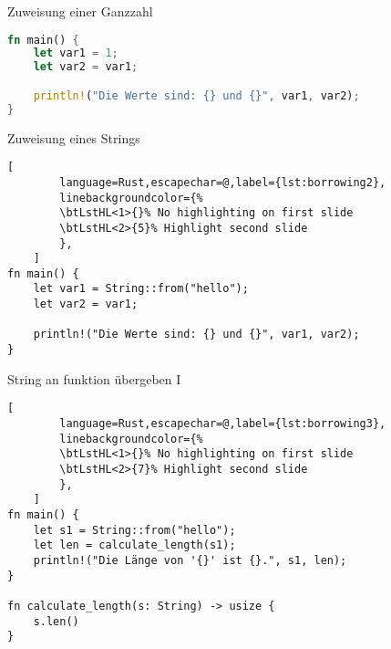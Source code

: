 
\begin{frame}[fragile,t]{Zuweisung einer Ganzzahl}
    \begin{lstlisting}[language=Rust,escapechar=@,label={lst:borrowing1}]
fn main() {
    let var1 = 1;
    let var2 = var1;

    println!("Die Werte sind: {} und {}", var1, var2);
}\end{lstlisting}
    \pause
\end{frame}

\begin{frame}[fragile,t]{Zuweisung eines Strings}
    \begin{lstlisting}[
        language=Rust,escapechar=@,label={lst:borrowing2},
        linebackgroundcolor={%
        \btLstHL<1>{}% No highlighting on first slide
        \btLstHL<2>{5}% Highlight second slide
        },
    ]
fn main() {
    let var1 = String::from("hello");
    let var2 = var1;

    println!("Die Werte sind: {} und {}", var1, var2);
}\end{lstlisting}
    \pause
\end{frame}

\begin{frame}[fragile,t]{String an funktion übergeben I}
    \begin{lstlisting}[
        language=Rust,escapechar=@,label={lst:borrowing3},
        linebackgroundcolor={%
        \btLstHL<1>{}% No highlighting on first slide
        \btLstHL<2>{7}% Highlight second slide
        },
    ]
fn main() {
    let s1 = String::from("hello");
    let len = calculate_length(s1);
    println!("Die Länge von '{}' ist {}.", s1, len);
}

fn calculate_length(s: String) -> usize {
    s.len()
}\end{lstlisting}
    \pause
\end{frame}

